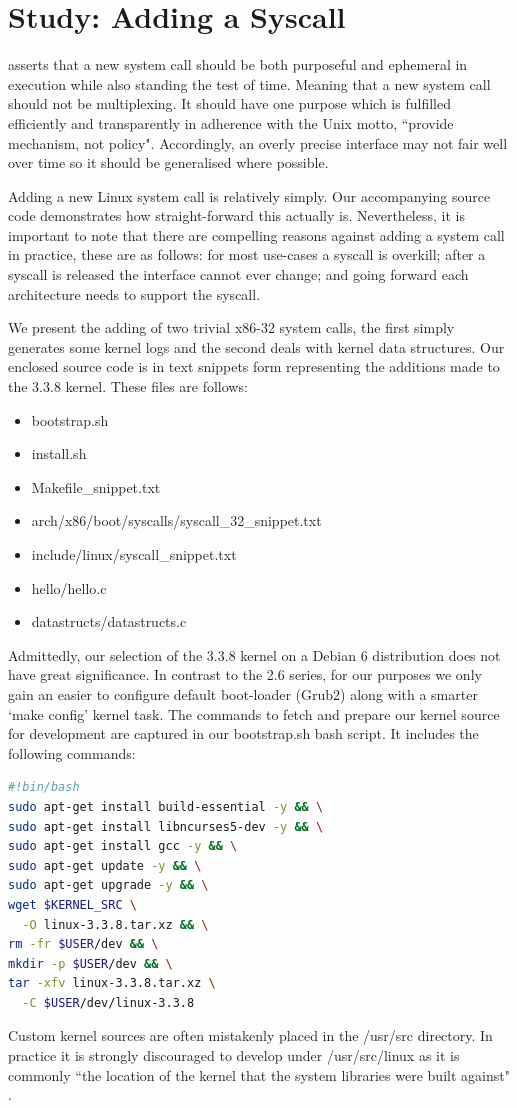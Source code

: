 \documentclass{article}
\begin{document}
\section{Study: Adding a Syscall}

\citet{Love7} asserts that a new system call should be both purposeful and ephemeral in execution while also standing the test of time. 
Meaning that a new system call should not be multiplexing. It should have one purpose which is fulfilled efficiently and transparently 
in adherence with the Unix motto, ``provide mechanism, not policy". Accordingly, 
an overly precise interface may not fair well over time so it should be generalised where possible. 
\par
Adding a new Linux system call is relatively simply. Our accompanying source code demonstrates
how straight-forward this actually is. Nevertheless, it is important to note
that there are compelling reasons against adding 
a system call in practice, these are as follows: for most use-cases a syscall is overkill; 
after a syscall is released the interface cannot ever change;
and going forward each architecture needs to support the syscall.
\par 
We present the adding of two trivial x86-32 system calls, the first simply generates some
kernel logs and the second deals with kernel data structures. Our enclosed 
source code is in text snippets form representing the additions made to
the 3.3.8 kernel. These files are follows:
\begin{itemize}
  \item bootstrap.sh
  \item install.sh
  \item Makefile\_snippet.txt
  \item arch/x86/boot/syscalls/syscall\_32\_snippet.txt
  \item include/linux/syscall\_snippet.txt
  \item hello/hello.c
  \item datastructs/datastructs.c
\end{itemize}

\noindent Admittedly, our selection of the 3.3.8 kernel on a Debian 6 distribution
does not have great significance. In contrast to the 2.6 series, for our purposes 
we only gain an easier to configure default boot-loader (Grub2) along with a smarter 
`make config' kernel task. The commands to fetch and prepare our kernel source
for development are captured in our bootstrap\@.sh bash script. It includes the following commands: 
\begin{lstlisting}[language=Bash]
#!bin/bash
sudo apt-get install build-essential -y && \
sudo apt-get install libncurses5-dev -y && \
sudo apt-get install gcc -y && \
sudo apt-get update -y && \
sudo apt-get upgrade -y && \
wget $KERNEL_SRC \
  -O linux-3.3.8.tar.xz && \
rm -fr $USER/dev && \
mkdir -p $USER/dev && \
tar -xfv linux-3.3.8.tar.xz \
  -C $USER/dev/linux-3.3.8
\end{lstlisting} 
Custom kernel sources are often mistakenly placed in the /usr/src directory. 
In practice it is strongly discouraged to develop under /usr/src/linux as it is
commonly ``the location of the kernel that 
the system libraries were built against" \citep{Love}.
  
\end{document}
